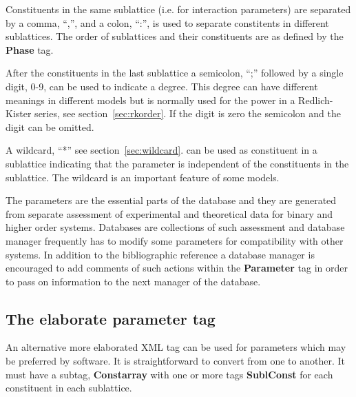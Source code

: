 \documentclass{article}
\begin{document}
Constituents in the same sublattice (i.e.  for interaction parameters)
are separated by a comma, ``,'', and a colon, ``:'', is used to
separate constitents in different sublattices.  The order of
sublattices and their constituents are as defined by the {\bf Phase}
tag.

After the constituents in the last sublattice a semicolon, ``;''
followed by a single digit, 0-9, can be used to indicate a degree.
This degree can have different meanings in different models but is
normally used for the power in a Redlich-Kister series, see
section~\ref{sec:rkorder}.  If the digit is zero the semicolon and the
digit can be omitted.

A wildcard, ``*'' see section~\ref{sec:wildcard}. can be used as
constituent in a sublattice indicating that the parameter is
independent of the constituents in the sublattice.  The wildcard is an
important feature of some models.

The parameters are the essential parts of the database and they are
generated from separate assessment of experimental and theoretical
data for binary and higher order systems.  Databases are collections
of such assessment and database manager frequently has to modify some
parameters for compatibility with other systems.  In addition to the
bibliographic reference a database manager is encouraged to add
comments of such actions within the {\bf Parameter} tag in order to
pass on information to the next manager of the database.


\subsection{The elaborate parameter tag}\label{sec:parameter2}

An alternative more elaborated XML tag can be used for parameters
which may be preferred by software.  It is straightforward to convert
from one to another.  It must have a subtag, {\bf Constarray} with one
or more tags {\bf SublConst} for each constituent in each sublattice.
\end{document}
